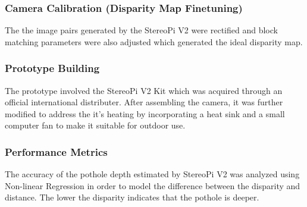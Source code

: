\subsubsection{Camera Calibration (Disparity  Map Finetuning)}
The the image pairs generated by the StereoPi V2 were rectified and block matching parameters were also adjusted which generated the ideal disparity map.

\subsubsection{Prototype Building}
The prototype involved the StereoPi V2 Kit which was acquired through an official international distributer. After assembling the camera, it was further modified to address the it's heating by incorporating a heat sink and a small computer fan to make it suitable for outdoor use.

\subsubsection{Performance Metrics}
The accuracy of the pothole depth estimated by StereoPi V2 was analyzed using Non-linear Regression in order to model the difference between the disparity and distance. The lower the disparity indicates that the pothole is deeper.


